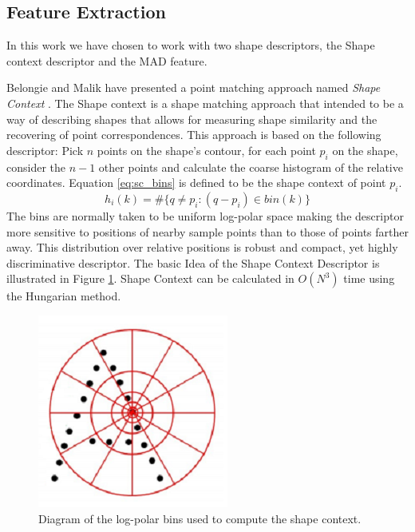 \documentclass[10pt, conference, compsocconf]{IEEEtran}
\theoremstyle{definition}
\begin{document}
\subsection{Feature Extraction}

\iftoggle{edit-mode}{\hspace{0pt}\marginpar{Selected Descriptors}}{}
In this work we have chosen to work with two shape descriptors, the Shape context descriptor and the MAD feature. 

\iftoggle{edit-mode}{\hspace{0pt}\marginpar{Shape Context}}{}
Belongie and Malik have presented a point matching approach named \emph{Shape Context} \cite{belongie2002shape}. 
The Shape context is a shape matching approach that intended to be a way of describing shapes that allows for measuring shape similarity and the recovering of point correspondences. 
This approach is based on the following descriptor: Pick $n$ points on the shape's contour, for each point ${p_i}$ on the shape, consider the $n - 1$ other points and calculate the coarse histogram of the relative coordinates. Equation \ref{eq:sc_bins} is defined to be the shape context of point ${p_i}$.
\begin{equation}
{h_i}(k) = \# \{q \ne p_i:(q - p_i) \in bin(k) \}
\label{eq:sc_bins}
\end{equation}
The bins are normally taken to be uniform log-polar space making the descriptor more sensitive to positions of nearby sample points than to those of points farther away. 
This distribution over relative positions is robust and compact, yet highly discriminative descriptor. 
The basic Idea of the Shape Context Descriptor is illustrated in Figure \ref{fig:shape_context_demo}. 
Shape Context can be calculated in $O(N^3)$ time using the Hungarian method.

\begin{figure}
\centering
\label{fig:shape_context_online}
\includegraphics[width=0.3\columnwidth]{./figures/shape_context_online}
\caption{Diagram of the log-polar bins used to compute the shape context.}
\label{fig:shape_context_demo}
\end{figure}
\end{document}
